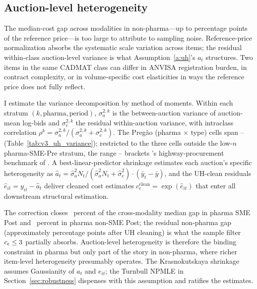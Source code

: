\subsection{Auction-level heterogeneity}

The median-cost gap across modalities in non-pharma---up to \crossModalityGapPp{} percentage points of the reference price---is too large to attribute to sampling noise. Reference-price normalization absorbs the systematic scale variation across items; the residual within-class auction-level variance is what Assumption~\ref{a:uh}'s $a_t$ structures. Two items in the same CADMAT class can differ in ANVISA registration burden, in contract complexity, or in volume-specific cost elasticities in ways the reference price does not fully reflect.

I estimate the variance decomposition by method of moments. Within each stratum $(k, \text{pharma}, \text{period})$, $\sigma_a^{2,k}$ is the between-auction variance of auction-mean log-bids and $\sigma_e^{2,k}$ the residual within-auction variance, with intraclass correlation $\rho^k = \sigma_a^{2,k} / (\sigma_a^{2,k} + \sigma_e^{2,k})$. The Preg\~ao (pharma $\times$ type) cells span \iccPharmaSmeAvg{}--\iccPharmaNonSme{} (Table~\ref{tab:v3_uh_variance}); restricted to the three cells outside the low-$n$ pharma-SME-Pre stratum, the range \iccNpSme--\iccPharmaNonSme{} brackets \citet{krasnokutskaya2011}'s highway-procurement benchmark of \krasICC. A best-linear-predictor shrinkage estimates each auction's specific heterogeneity as $\hat{a}_t = \hat\sigma_a^2 N_t / (\hat\sigma_a^2 N_t + \hat\sigma_e^2) \cdot (\bar y_t - \bar y)$, and the UH-clean residuals $\hat e_{it} = y_{it} - \hat a_t$ deliver cleaned cost estimates $c_\epsilon^{\text{clean}} = \exp(\hat e_{it})$ that enter all downstream structural estimation.

The correction closes \uhCloseGapPharmaPct~percent of the cross-modality median gap in pharma SME Post and \uhCloseGapNpPct~percent in pharma non-SME Post; the residual non-pharma gap (approximately \uhResidGapNp{} percentage points after UH cleaning) is what the sample filter $c_\epsilon \le 3$ partially absorbs. Auction-level heterogeneity is therefore the binding constraint in pharma but only part of the story in non-pharma, where richer item-level heterogeneity presumably operates. The Krasnokutskaya shrinkage assumes Gaussianity of $a_t$ and $e_{it}$; the Turnbull NPMLE in Section~\ref{sec:robustness} dispenses with this assumption and ratifies the estimates.

